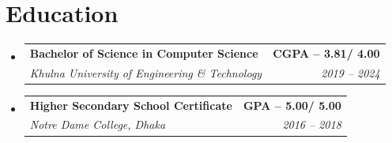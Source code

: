 \documentclass[letterpaper,11pt]{article}
\makeatletter
\newcommand{\resumeSubHeadingListStart}{\begin{itemize}[leftmargin=0.0in, label={}]}
\newcommand{\resumeSubheading}[4]{
  \item
    \begin{tabular*}{1.0\textwidth}[t]{l@{\extracolsep{\fill}}r}
        \textbf{#1} & \textbf{\small #2} \\
        \textit{\small#3} & \textit{\small #4} \\
    \end{tabular*}
}
\newcommand{\resumeSubHeadingListEnd}{\end{itemize}}
\makeatother
\begin{document}
\section{Education}
\resumeSubHeadingListStart

    \resumeSubheading
    {Bachelor of Science in Computer Science}{CGPA -- 3.81/ 4.00}
    {Khulna University of Engineering \& Technology}{2019 -- 2024}
    \vspace{-9pt}

    \resumeSubheading
    {Higher Secondary School Certificate}{GPA -- 5.00/ 5.00}
    {Notre Dame College, Dhaka}{2016 -- 2018}
    \vspace{-9pt}

\resumeSubHeadingListEnd


\end{document}
